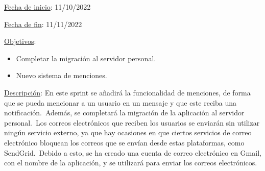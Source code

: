 
\underline{Fecha de inicio}: 11/10/2022

\underline{Fecha de fin}: 11/11/2022

\underline{Objetivos}:
\begin{itemize}
	\item Completar la migración al servidor personal.
	\item Nuevo sistema de menciones.
\end{itemize}

\underline{Descripción}:
En este sprint se añadirá la funcionalidad de menciones, de forma que se pueda mencionar a un usuario en un
mensaje y que este reciba una notificación.\ Además, se completará la migración de la aplicación al servidor
personal.\ Los correos electrónicos que reciben los usuarios se enviarán sin utilizar ningún servicio externo,
ya que hay ocasiones en que ciertos servicios de correo electrónico bloquean los correos que se envían desde
estas plataformas, como SendGrid.\ Debido a esto, se ha creado una cuenta de correo electrónico en Gmail, con el nombre
de la aplicación, y se utilizará para enviar los correos electrónicos.


